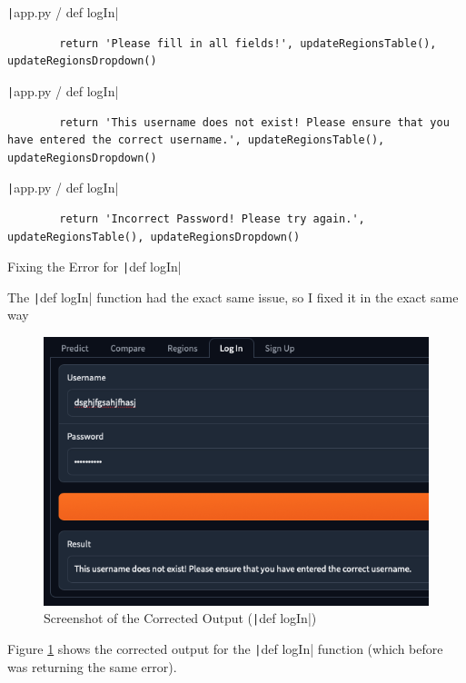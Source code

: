 \documentclass[12pt]{report}
\newcommand{\pil}[1]{\protect\texttt|#1|}
\begin{document}
\begin{listing}[H]
\pil{app.py / def logIn}
\begin{verbatim}
        return 'Please fill in all fields!', updateRegionsTable(), updateRegionsDropdown()
\end{verbatim}
\pil{app.py / def logIn}
\begin{verbatim}
        return 'This username does not exist! Please ensure that you have entered the correct username.', updateRegionsTable(), updateRegionsDropdown()
\end{verbatim}
\pil{app.py / def logIn}
\begin{verbatim}
        return 'Incorrect Password! Please try again.', updateRegionsTable(), updateRegionsDropdown()
\end{verbatim}
\caption{Fixing the Error for \pil{def logIn}}\label{cs:fixForLogIn}
\end{listing}

The \pil{def logIn} function had the exact same issue, so I fixed it in the exact same way

\begin{figure}[H]
\centering
\includegraphics[width=12cm]{ss22.3.png}
\caption{Screenshot of the Corrected Output (\pil{def logIn})}\label{fig:ss22.3}
\end{figure}

Figure \ref{fig:ss22.3} shows the corrected output for the \pil{def logIn} function (which before was returning the same error).

\begin{center}
\end{center}
\end{document}
